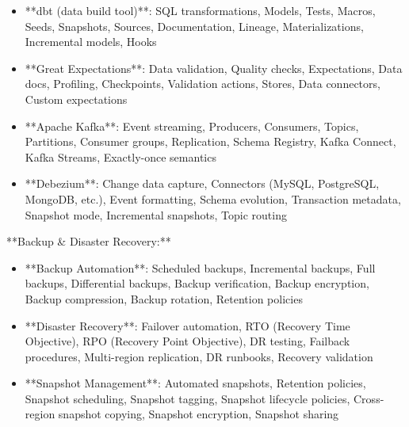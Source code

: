 \documentclass[11pt,a4paper]{article}
\begin{document}
\begin{itemize}
\item **dbt (data build tool)**: SQL transformations, Models, Tests, Macros, Seeds, Snapshots, Sources, Documentation, Lineage, Materializations, Incremental models, Hooks
\end{itemize}

\begin{itemize}
\item **Great Expectations**: Data validation, Quality checks, Expectations, Data docs, Profiling, Checkpoints, Validation actions, Stores, Data connectors, Custom expectations
\end{itemize}

\begin{itemize}
\item **Apache Kafka**: Event streaming, Producers, Consumers, Topics, Partitions, Consumer groups, Replication, Schema Registry, Kafka Connect, Kafka Streams, Exactly-once semantics
\end{itemize}

\begin{itemize}
\item **Debezium**: Change data capture, Connectors (MySQL, PostgreSQL, MongoDB, etc.), Event formatting, Schema evolution, Transaction metadata, Snapshot mode, Incremental snapshots, Topic routing
\end{itemize}

**Backup \& Disaster Recovery:**

\begin{itemize}
\item **Backup Automation**: Scheduled backups, Incremental backups, Full backups, Differential backups, Backup verification, Backup encryption, Backup compression, Backup rotation, Retention policies
\end{itemize}

\begin{itemize}
\item **Disaster Recovery**: Failover automation, RTO (Recovery Time Objective), RPO (Recovery Point Objective), DR testing, Failback procedures, Multi-region replication, DR runbooks, Recovery validation
\end{itemize}

\begin{itemize}
\item **Snapshot Management**: Automated snapshots, Retention policies, Snapshot scheduling, Snapshot tagging, Snapshot lifecycle policies, Cross-region snapshot copying, Snapshot encryption, Snapshot sharing
\end{itemize}
\end{document}
